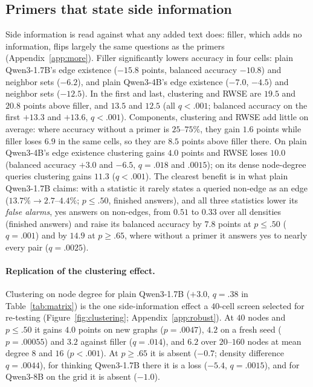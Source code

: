 \documentclass[11pt]{article}
\begin{document}
\subsection{Primers that state side information}
Side information is read against what any added text does: filler, which adds no information, flips largely the same questions as the primers (Appendix~\ref{app:more}).
Filler significantly lowers accuracy in four cells: plain Qwen3-1.7B's edge existence ($-15.8$ points, balanced accuracy $-10.8$) and neighbor sets ($-6.2$), and plain Qwen3-4B's edge existence ($-7.0$, $-4.5$) and neighbor sets ($-12.5$). %
In the first and last, clustering and RWSE are $19.5$ and $20.8$ points above filler, and $13.5$ and $12.5$ (all $q<.001$; balanced accuracy on the first $+13.3$ and $+13.6$, $q<.001$). %
Components, clustering and RWSE add little on average: where accuracy without a primer is $25$--$75\%$, they gain $1.6$ points while filler loses $6.9$ in the same cells, %
so they are $8.5$ points above filler there. On plain Qwen3-4B's edge existence clustering gains $4.0$ points and RWSE loses $10.0$ (balanced accuracy $+3.0$ and $-6.5$, $q=.018$ and $.0015$); %
on its dense node-degree queries clustering gains $11.3$ ($q<.001$). %
The clearest benefit is in what plain Qwen3-1.7B claims: with a statistic it rarely states a queried non-edge as an edge ($13.7\%\to2.7$--$4.4\%$; $p\leq.50$, finished answers), %
and all three statistics lower its \emph{false alarms}, yes answers on non-edges, from $0.51$ to $0.33$ over all densities (finished answers) %
and raise its balanced accuracy by $7.8$ points at $p\leq.50$ ($q=.001$) and by $14.9$ at $p\geq.65$, where without a primer it answers yes to nearly every pair ($q=.0025$). %

\paragraph{Replication of the clustering effect.} Clustering on node degree for plain Qwen3-1.7B ($+3.0$, $q=.38$ in Table~\ref{tab:matrix}) is the one side-information effect a $40$-cell screen selected for re-testing (Figure~\ref{fig:clustering}; Appendix~\ref{app:robust}). At $40$ nodes and $p\leq.50$ it gains $4.0$ points on new graphs ($p=.0047$), $4.2$ on a fresh seed ($p=.00055$) and $3.2$ against filler ($q=.014$), and $6.2$ over $20$--$160$ nodes at mean degree $8$ and $16$ ($p<.001$). %
At $p\geq.65$ it is absent ($-0.7$; density difference $q=.0044$), for thinking Qwen3-1.7B there it is a loss ($-5.4$, $q=.0015$), and for Qwen3-8B on the grid it is absent ($-1.0$). %
\end{document}
